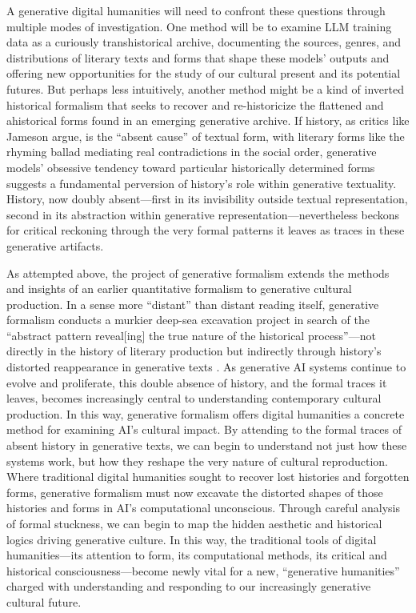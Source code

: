 \documentclass{simple-humanities}         %
\begin{document}
A generative digital humanities will need to confront these questions through multiple modes of investigation. 
One method will be to examine LLM training data as a curiously transhistorical archive, documenting the sources, genres, and distributions of literary texts and forms that shape these models' outputs and offering new opportunities for the study of our cultural present and its potential futures.
But perhaps less intuitively, another method might be a kind of inverted historical formalism that seeks to recover and re-historicize the flattened and ahistorical forms found in an emerging generative archive.
If history, as critics like Jameson argue, is the ``absent cause'' of textual form, with literary forms like the rhyming ballad mediating real contradictions in the social order, generative models' obsessive tendency toward particular historically determined forms suggests a fundamental perversion of history's role within generative textuality.
History, now doubly absent---first in its invisibility outside textual representation, second in its abstraction within generative representation---nevertheless beckons for critical reckoning through the very formal patterns it leaves as traces in these generative artifacts.

As attempted above, the project of generative formalism extends the methods and insights of an earlier quantitative formalism to generative cultural production.
In a sense more ``distant'' than distant reading itself, generative formalism conducts a murkier deep-sea excavation project in search of the ``abstract pattern reveal{[}ing{]} the true nature of the historical process''---not directly in the history of literary production but indirectly through history's distorted reappearance in generative texts \parencite[29]{morettiGraphsMapsTrees2005}.
As generative AI systems continue to evolve and proliferate, this double absence of history, and the formal traces it leaves, becomes increasingly central to understanding contemporary cultural production. 
In this way, generative formalism offers digital humanities a concrete method for examining AI's cultural impact. 
By attending to the formal traces of absent history in generative texts, we can begin to understand not just how these systems work, but how they reshape the very nature of cultural reproduction.
Where traditional digital humanities sought to recover lost histories and forgotten forms, generative formalism must now excavate the distorted shapes of those histories and forms in AI's computational unconscious.
Through careful analysis of formal stuckness, we can begin to map the hidden aesthetic and historical logics driving generative culture. In this way, the traditional tools of digital humanities---its attention to form, its computational methods, its critical and historical consciousness---become newly vital for a new, ``generative humanities'' charged with understanding and responding to our increasingly generative cultural future.



\printbibliography[title={Works Cited}]
\end{document}
